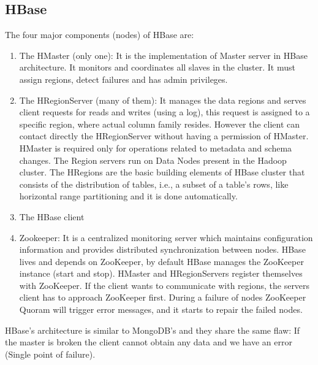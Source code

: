 \documentclass[a4page, 11pt]{article}
\begin{document}
\subsection{HBase}
The four major components (nodes) of HBase are:
\begin{enumerate}[noitemsep]
	\item The HMaster (only one): It is the implementation of Master server in HBase architecture. It monitors and coordinates all slaves in the cluster. It must assign regions, detect failures and has admin privileges. 
	\item The HRegionServer (many of them): It manages the data regions and serves client requests for reads and writes (using a log), this request is assigned to a specific region, where actual column family resides. However the client can contact directly the HRegionServer without having a permission of HMaster. HMaster is required only for operations related to metadata and schema changes. The Region servers run on Data Nodes present in the Hadoop cluster.\newline
	The HRegions are the basic building elements of HBase cluster that consists of the distribution of tables, i.e., a subset of a table's rows, like horizontal range partitioning and it is done automatically.
	\item The HBase client
	\item Zookeeper: It is a centralized monitoring server which maintains configuration information and provides distributed synchronization between nodes.
	HBase lives and depends on ZooKeeper, by default HBase manages the ZooKeeper instance (start and stop). 
	HMaster and HRegionServers register themselves with ZooKeeper.
	If the client wants to communicate with regions, the servers client has to approach ZooKeeper first.
	During a failure of nodes ZooKeeper Quoram will trigger error messages, and it starts to repair the failed nodes.
\end{enumerate}
HBase's architecture is similar to MongoDB's and they share the same flaw: If the master is broken the client cannot obtain any data and we have an error (Single point of failure).
\end{document}
